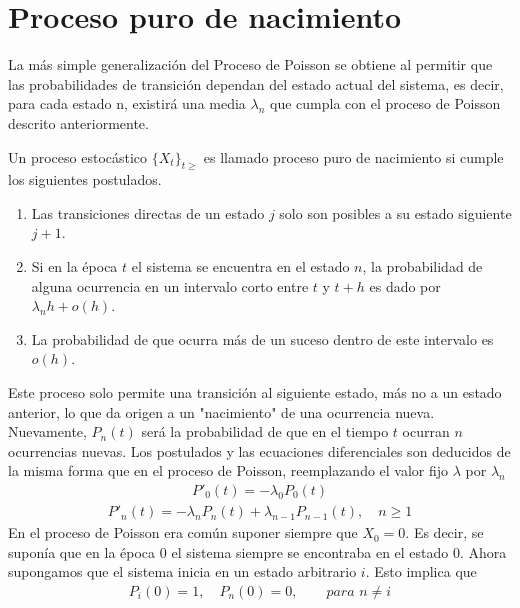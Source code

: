 \section{Proceso puro de nacimiento}
\label{proc_nac}
La más simple generalización del Proceso de Poisson se obtiene al permitir que las probabilidades de transición dependan del estado actual del sistema, es decir, para cada estado n, existirá una media $\lambda_n$ que cumpla con el proceso de Poisson descrito anteriormente.
\begin{Def}
Un proceso estocástico $\{X_t\}_{t\geq}$ es llamado proceso puro de nacimiento si cumple los siguientes postulados.
    \begin{enumerate}
        \item Las transiciones directas de un estado $j$ solo son posibles a su estado siguiente $j+1$.
        \item Si en la época $t$ el sistema se encuentra en el estado $n$, la probabilidad de alguna ocurrencia en un intervalo corto entre $t$ y $t+h$ es dado por $\lambda_n h+o(h)$. 
        \item La probabilidad de que ocurra más de un suceso dentro de este intervalo es $o(h)$.
    \end{enumerate}
\end{Def}
Este proceso solo permite una transición al siguiente estado, más no a un estado anterior, lo que da origen a un "nacimiento" de una ocurrencia nueva.\\Nuevamente, $P_n(t)$ será la probabilidad de que en el tiempo $t$ ocurran $n$ ocurrencias nuevas.
Los postulados y las ecuaciones diferenciales son deducidos de la misma forma que en el proceso de Poisson, reemplazando el valor fijo $\lambda$ por $\lambda_n$
\begin{eqnarray}
    P'_0(t)=-\lambda_0 P_0(t)
    \label{procNacimiento-edo-0}
\end{eqnarray}
\begin{eqnarray}
    P'_n(t)=-\lambda_n P_n(t)+\lambda_{n-1} P_{n-1}(t),\quad n\geq 1
    \label{procNacimiento-edo-n}
\end{eqnarray}
En el proceso de Poisson era común suponer siempre que $X_0=0$. Es decir, se suponía que en la época $0$ el sistema siempre se encontraba en el estado $0$.
Ahora supongamos que el sistema inicia en un estado arbitrario $i$. Esto implica que
\begin{eqnarray}
    P_i(0)=1,\quad P_n(0)=0,\quad\quad\textit{para }n\not=i
    \label{procNacimiento-edo-condInicial}
\end{eqnarray}
